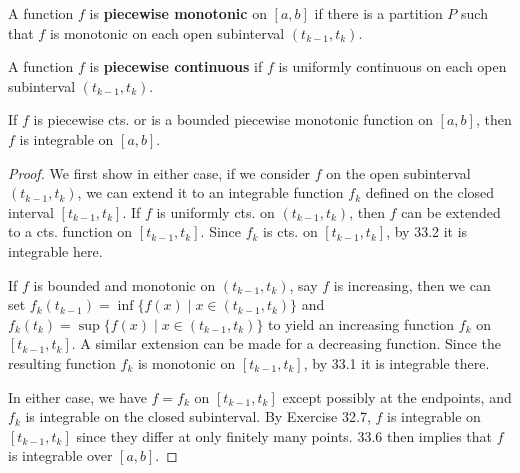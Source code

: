 \documentclass{article}
\begin{document}
  \begin{definition}
    A function $f$ is \textbf{piecewise monotonic} on $[a, b]$ if there is a partition $P$ such that $f$ is monotonic on each open subinterval $(t_{k-1}, t_k)$.
  \end{definition}
  \begin{definition}
    A function $f$ is \textbf{piecewise continuous} if $f$ is uniformly continuous on each open subinterval $(t_{k-1}, t_k)$.
  \end{definition}
  \begin{cthm}[Theorem 33.8]
    If $f$ is piecewise cts. or is a bounded piecewise monotonic function on $[a, b]$, then $f$ is integrable on $[a, b]$.
  \end{cthm}
  \begin{proof}
    We first show in either case, if we consider $f$ on the open subinterval $(t_{k-1}, t_k)$, we can extend it to an integrable function $f_k$ defined on the closed interval $[t_{k-1}, t_k]$. If $f$ is uniformly cts. on $(t_{k-1}, t_k)$, then $f$ can be extended to a cts. function on $[t_{k-1}, t_k]$. Since $f_k$ is cts. on $[t_{k-1}, t_k]$, by 33.2 it is integrable here.

    If $f$ is bounded and monotonic on $(t_{k-1}, t_k)$, say $f$ is increasing, then we can set $f_k(t_{k-1}) = \inf\{f(x) \mid x \in (t_{k-1}, t_k)\}$ and $f_k(t_k) = \sup\{f(x) \mid x \in (t_{k-1}, t_k)\}$ to yield an increasing function $f_k$ on $[t_{k-1}, t_k]$. A similar extension can be made for a decreasing function. Since the resulting function $f_k$ is monotonic on $[t_{k-1}, t_k]$, by 33.1 it is integrable there.

    In either case, we have $f = f_k$ on $[t_{k-1}, t_k]$ except possibly at the endpoints, and $f_k$ is integrable on the closed subinterval. By Exercise 32.7, $f$ is integrable on $[t_{k-1}, t_k]$ since they differ at only finitely many points. 33.6 then implies that $f$ is integrable over $[a, b]$.
  \end{proof}
\end{document}
